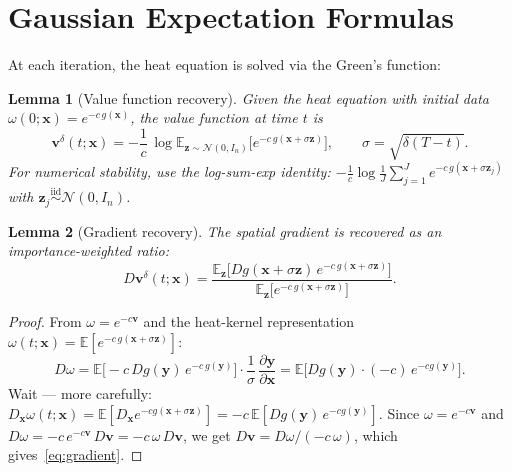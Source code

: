 \documentclass[11pt]{article}
\newtheorem{lemma}{Lemma}
\newcommand{\E}{\mathbb{E}}
\newcommand{\bx}{\bm{x}}
\newcommand{\by}{\bm{y}}
\newcommand{\bz}{\bm{z}}
\newcommand{\bv}{\bm{v}}
\begin{document}
\section{Gaussian Expectation Formulas}

At each iteration, the heat equation is solved via the Green's function:

\begin{lemma}[Value function recovery]\label{lem:value}
  Given the heat equation with initial data $\omega(0;\bx) = e^{-c\,g(\bx)}$,
  the value function at time $t$ is
  \begin{equation}\label{eq:value}
    \bv^\delta(t;\bx)
    = -\frac{1}{c}\,\log\E_{\bz\sim\mathcal{N}(0,I_n)}
      \bigl[e^{-c\,g(\bx + \sigma\bz)}\bigr],
    \qquad \sigma = \sqrt{\delta(T-t)}.
  \end{equation}
  For numerical stability, use the log-sum-exp identity:
  $-\frac{1}{c}\log\frac{1}{J}\sum_{j=1}^J e^{-c\,g(\bx+\sigma\bz_j)}$
  with $\bz_j\stackrel{\text{iid}}{\sim}\mathcal{N}(0,I_n)$.
\end{lemma}

\begin{lemma}[Gradient recovery]\label{lem:gradient}
  The spatial gradient is recovered as an importance-weighted ratio:
  \begin{equation}\label{eq:gradient}
    D\bv^\delta(t;\bx)
    = \frac{\E_{\bz}\bigl[Dg(\bx+\sigma\bz)\,e^{-c\,g(\bx+\sigma\bz)}\bigr]}
           {\E_{\bz}\bigl[e^{-c\,g(\bx+\sigma\bz)}\bigr]}.
  \end{equation}
\end{lemma}

\begin{proof}
  From $\omega = e^{-c\bv}$ and the heat-kernel representation
  $\omega(t;\bx) = \E[e^{-c\,g(\bx+\sigma\bz)}]$:
  \[
    D\omega = \E\bigl[-c\,Dg(\by)\,e^{-c\,g(\by)}\bigr]
    \cdot\frac{1}{\sigma}\,\frac{\partial\by}{\partial\bx}
    = \E\bigl[Dg(\by)\cdot(-c)\,e^{-cg(\by)}\bigr].
  \]
  Wait --- more carefully:
  $D_\bx\omega(t;\bx) = \E[D_\bx e^{-cg(\bx+\sigma\bz)}] = -c\,\E[Dg(\by)\,e^{-cg(\by)}]$.
  Since $\omega = e^{-c\bv}$ and $D\omega = -c\,e^{-c\bv}\,D\bv = -c\,\omega\,D\bv$,
  we get $D\bv = D\omega / (-c\,\omega)$, which gives~\eqref{eq:gradient}.
\end{proof}

\end{document}
